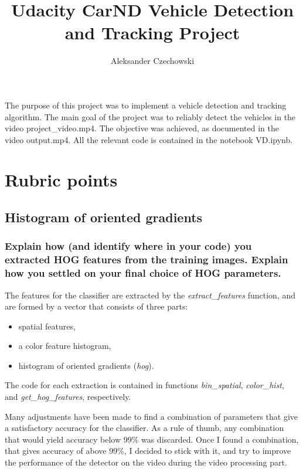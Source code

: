 \documentclass[a4paper,10pt]{article}
\begin{document}
\pagestyle{empty}
\noindent

\title{Udacity CarND Vehicle Detection and Tracking Project}
\author{Aleksander Czechowski}
\maketitle

The purpose of this project was to implement a vehicle detection and tracking algorithm.
The main goal of the project was to reliably detect the vehicles in the video project\_video.mp4.
The objective was achieved, as documented in the video output.mp4.
All the relevant code is contained in the notebook VD.ipynb.

\section{Rubric points}

\subsection{Histogram of oriented gradients}

\subsubsection{Explain how (and identify where in your code) you extracted HOG features from the training images. Explain how you settled on your final choice of HOG parameters.}

The features for the classifier are extracted by the \emph{extract\_features} function,
and are formed by a vector that consists of three parts:
%
\begin{itemize}
  \item spatial features,
  \item a color feature histogram,
  \item histogram of oriented gradients (\emph{hog}).
\end{itemize}

The code for each extraction is contained in functions 
\emph{bin\_spatial}, \emph{color\_hist}, and \emph{get\_hog\_features}, respectively.

Many adjustments have been made to find a combination of parameters that give a satisfactory accuracy for the classifier.
As a rule of thumb, any combination that would yield accuracy below 99\% was discarded.
Once I found a combination, that gives accuracy of above 99\%, I decided to stick with it,
and try to improve the performance of the detector on the video during the video processing part.
\end{document}
